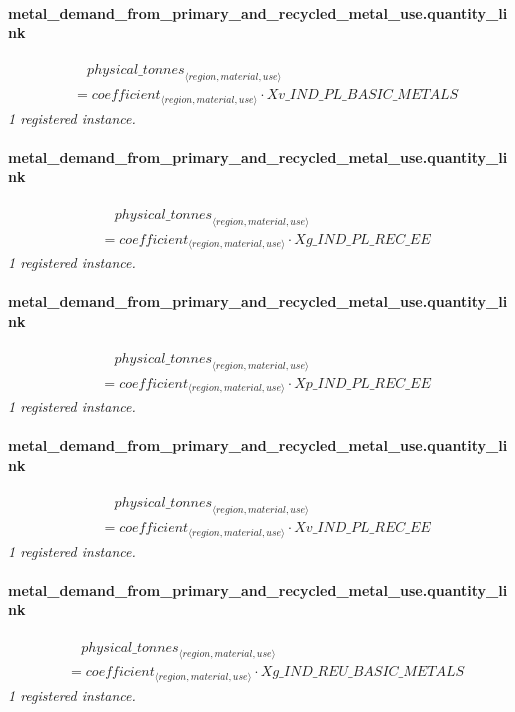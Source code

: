 \documentclass[11pt]{article}
\begin{document}
\paragraph{metal\_demand\_from\_primary\_and\_recycled\_metal\_use.quantity\_link}
\begin{align*}
&\quad {physical\_tonnes}_{\langle region, material, use\rangle}\\
&= coefficient_{\langle region, material, use\rangle} \cdot Xv\_IND\_PL\_BASIC\_METALS
\end{align*}
\noindent\emph{1 registered instance.}\par
\paragraph{metal\_demand\_from\_primary\_and\_recycled\_metal\_use.quantity\_link}
\begin{align*}
&\quad {physical\_tonnes}_{\langle region, material, use\rangle}\\
&= coefficient_{\langle region, material, use\rangle} \cdot Xg\_IND\_PL\_REC\_EE
\end{align*}
\noindent\emph{1 registered instance.}\par
\paragraph{metal\_demand\_from\_primary\_and\_recycled\_metal\_use.quantity\_link}
\begin{align*}
&\quad {physical\_tonnes}_{\langle region, material, use\rangle}\\
&= coefficient_{\langle region, material, use\rangle} \cdot Xp\_IND\_PL\_REC\_EE
\end{align*}
\noindent\emph{1 registered instance.}\par
\paragraph{metal\_demand\_from\_primary\_and\_recycled\_metal\_use.quantity\_link}
\begin{align*}
&\quad {physical\_tonnes}_{\langle region, material, use\rangle}\\
&= coefficient_{\langle region, material, use\rangle} \cdot Xv\_IND\_PL\_REC\_EE
\end{align*}
\noindent\emph{1 registered instance.}\par
\paragraph{metal\_demand\_from\_primary\_and\_recycled\_metal\_use.quantity\_link}
\begin{align*}
&\quad {physical\_tonnes}_{\langle region, material, use\rangle}\\
&= coefficient_{\langle region, material, use\rangle} \cdot Xg\_IND\_REU\_BASIC\_METALS
\end{align*}
\noindent\emph{1 registered instance.}\par
\end{document}

